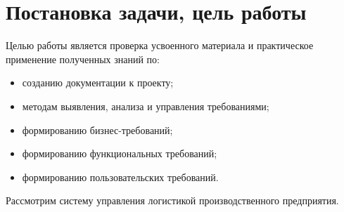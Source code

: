 \chapter*{Постановка задачи, цель работы}
\label{ch:the_goal}

Целью работы является проверка усвоенного материала и практическое применение полученных знаний по:
\begin{itemize}
    \item созданию документации к проекту;
    \item методам выявления, анализа и управления требованиями;
    \item формированию бизнес-требований;
    \item формированию функциональных требований;
    \item формированию пользовательских требований.
\end{itemize}

Рассмотрим систему управления логистикой производственного предприятия.

\endinput
